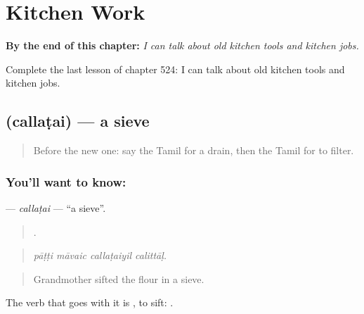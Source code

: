 
\chapter{Kitchen Work}
\label{ch:ta-kitchen-work}

\begin{chapteropening}
\textbf{By the end of this chapter:} \emph{I can talk about old kitchen tools and kitchen jobs.}

Complete the last lesson of chapter 524: I can talk about old kitchen tools and kitchen jobs.
\end{chapteropening}

\section[\texorpdfstring{\ta{சல்லடை} (callaṭai)}{சல்லடை (callaṭai)}]{ (callaṭai) — a sieve}

\label{lesson:TA-C524-callatai}



\begin{quote}
Before the new one: say the Tamil for a drain, then the Tamil for to filter.
\end{quote}

\subsection*{You'll want to know: }
\textbf{} — \emph{callaṭai} — \textquotedblleft{}a sieve\textquotedblright{}.

\begin{quote}
   .
\end{quote}

\begin{quote}
\emph{pāṭṭi māvaic callaṭaiyil calittāḷ.}
\end{quote}

\begin{quote}
Grandmother sifted the flour in a sieve.
\end{quote}

The verb that goes with it is , to sift:  .

